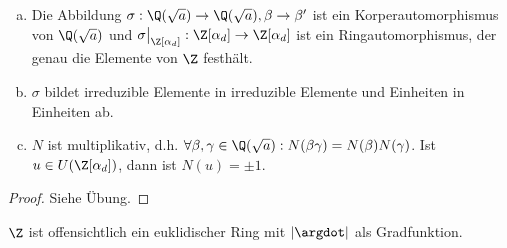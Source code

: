 \begin{lem} \label{4.8}
	\begin{enumerate}[a)]
		\item
			Die Abbildung $\sigma: \Q(\sqrt a) \to \Q(\sqrt a), \beta \to \beta'$ ist ein Korperautomorphismus von $\Q(\sqrt a)$ und $\sigma\big|_{\Z[\alpha_d]} : \Z[\alpha_d] \to \Z[\alpha_d]$ ist ein Ringautomorphismus, der genau die Elemente von $\Z$ festhält.
		\item
			$\sigma$ bildet irreduzible Elemente in irreduzible Elemente und Einheiten in Einheiten ab.
		\item
			$N$ ist multiplikativ, d.h. $\forall \beta, \gamma \in \Q(\sqrt a): N(\beta \gamma) = N(\beta) N(\gamma)$.
			Ist $u \in U(\Z[\alpha_d])$, dann ist $N(u) = \pm 1$.
	\end{enumerate}
	\begin{proof}
		Siehe Übung.
	\end{proof}
\end{lem}

$\Z$ ist offensichtlich ein euklidischer Ring mit $|\argdot|$ als Gradfunktion.

